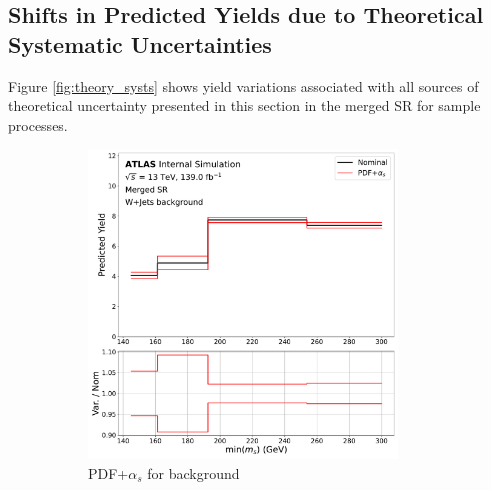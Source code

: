 \subsection{Shifts in Predicted Yields due to Theoretical Systematic Uncertainties}

Figure \ref{fig:theory_systs} shows yield variations associated with all sources of theoretical uncertainty presented in this section in the merged SR for sample processes. 

\begin{figure}[!tb]
  \centering
    \begin{subfigure}{0.45\textwidth}
    \centering
    \includegraphics[width=0.9\textwidth]{Figures/6/pdf_plus_alphas_syst_W+Jets_SR_mgd_TARJets10_minmS_mgd_yield.pdf}
    \caption{PDF+\(\alpha_s\) for \wjets background}
    \label{fig:wjets_pdf}
  \end{subfigure} \hspace{1em}
  \begin{subfigure}{0.45\textwidth}
  \centering

\end{subfigure}
\end{figure}

